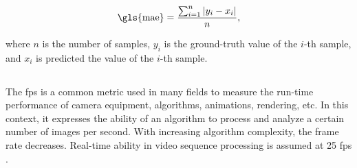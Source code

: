         \begin{equation}
            \text{\gls{mae}} = \frac{\sum_{i = 1}^n |y_i - x_i|}{n},
        \end{equation}
        
        where $n$ is the number of samples, $y_i$ is the ground-truth value of the $i$-th sample, and $x_i$ is predicted the value of the $i$-th sample.

    \subsection{} 
        The \gls{fps} is a common metric used in many fields to measure the run-time performance of camera equipment, algorithms, animations, rendering, etc. In this context, it expresses the ability of an algorithm to process and analyze a certain number of images per second. With increasing algorithm complexity, the frame rate decreases. Real-time ability in video sequence processing is assumed at 25 \gls{fps} \cite{MOTChallenge2015}.